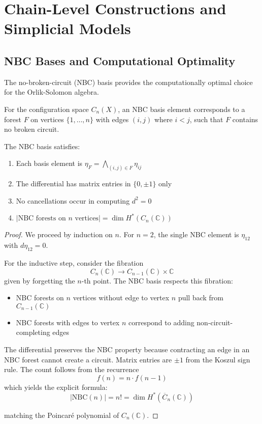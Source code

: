 \section{Chain-Level Constructions and Simplicial Models}
 
\subsection{NBC Bases and Computational Optimality}
 
The no-broken-circuit (NBC) basis provides the computationally optimal choice for the Orlik-Solomon algebra.
 
\begin{definition}
For the configuration space $C_n(X)$, an NBC basis element corresponds to a forest $F$ on vertices $\{1,\ldots,n\}$ with edges $(i,j)$ where $i < j$, such that $F$ contains no broken circuit.
\end{definition}
 
\begin{theorem}
The NBC basis satisfies:
\begin{enumerate}
\item Each basis element is $\eta_F = \bigwedge_{(i,j) \in F} \eta_{ij}$
\item The differential has matrix entries in $\{0, \pm 1\}$ only
\item No cancellations occur in computing $d^2 = 0$
\item $|\text{NBC forests on $n$ vertices}| = \dim H^*(C_n(\mathbb{C}))$
\end{enumerate}
\end{theorem}

\begin{proof}
We proceed by induction on $n$. For $n = 2$, the single NBC element is $\eta_{12}$ with $d\eta_{12} = 0$.
 
For the inductive step, consider the fibration
\[
C_n(\mathbb{C}) \to C_{n-1}(\mathbb{C}) \times \mathbb{C}
\]
given by forgetting the $n$-th point. The NBC basis respects this fibration:
\begin{itemize}
\item NBC forests on $n$ vertices without edge to vertex $n$ pull back from $C_{n-1}(\mathbb{C})$
\item NBC forests with edges to vertex $n$ correspond to adding non-circuit-completing edges
\end{itemize}
 
The differential preserves the NBC property because contracting an edge in an NBC forest cannot create a circuit. Matrix entries are $\pm 1$ from the Koszul sign rule. The count follows from the recurrence
\[
f(n) = n \cdot f(n-1)
\]
which yields the explicit formula:
\[
|\text{NBC}(n)| = n! = \dim H^*(\overline{C}_n(\mathbb{C}))
\]

matching the Poincaré polynomial of $C_n(\mathbb{C})$.
\end{proof}

